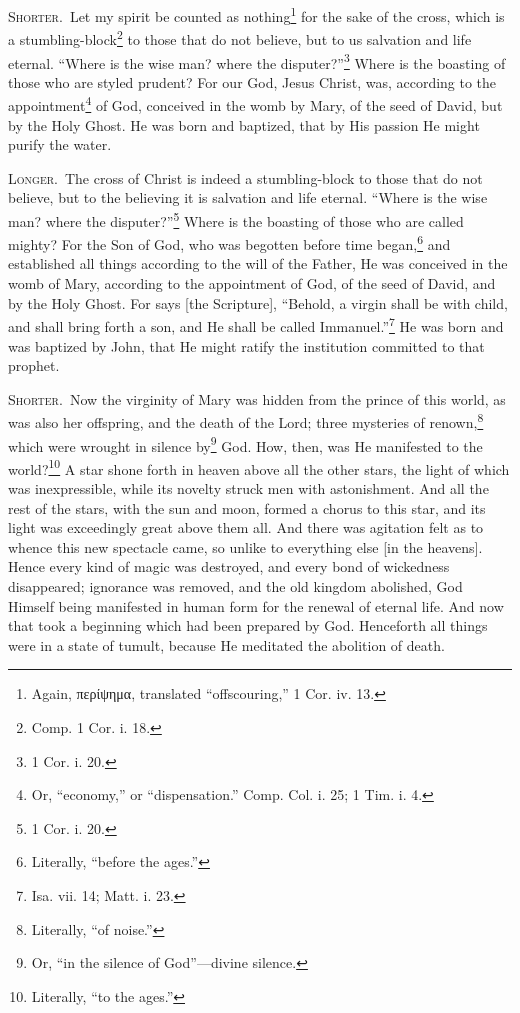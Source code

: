 
\textsc{Shorter.}~Let my spirit be counted as nothing\footnote{Again, \textgreek{περίψημα}, translated “offscouring,” 1 Cor. iv. 13.} for the sake of the cross, which is a stumbling-block\footnote{Comp. 1 Cor. i. 18.} to those that do not believe, but to us salvation and  life eternal. “Where is the wise man? where the disputer?”\footnote{1 Cor. i. 20.} Where is the boasting of those who are styled prudent? For our God, Jesus Christ, was, according to the appointment\footnote{Or, “economy,” or “dispensation.” Comp. Col. i. 25; 1 Tim. i. 4.} of God, conceived in the womb by Mary, of the seed of David, but by the Holy Ghost. He was born and baptized, that by His passion He might purify the water.

\textsc{Longer.}~The cross of Christ is indeed a stumbling-block to those that do not believe, but to the believing it is salvation and life eternal. “Where is the wise man? where the disputer?”\footnote{1 Cor. i. 20.} Where is the boasting of those who are called mighty? For the Son of God, who was begotten before time began,\footnote{Literally, “before the ages.”} and established all things according to the will of the Father, He was conceived in the womb of Mary, according to the appointment of God, of the seed of David, and by the Holy Ghost. For says [the Scripture], “Behold, a virgin shall be with child, and shall bring forth a son, and He shall be called Immanuel.”\footnote{Isa. vii. 14; Matt. i. 23.} He was born and was baptized by John, that He might ratify the institution committed to that prophet.


\textsc{Shorter.}~Now the virginity of Mary was hidden from the prince of this world, as was also her offspring, and the death of the Lord; three mysteries of renown,\footnote{Literally, “of noise.”} which were wrought in silence by\footnote{Or, “in the silence of God”—divine silence.} God. How, then, was He manifested to the world?\footnote{Literally, “to the ages.”} A star shone forth in heaven above all the other stars, the light of which was inexpressible, while its novelty struck men with astonishment. And all the rest of the stars, with the sun and moon, formed a chorus to this star, and its light was exceedingly great above them all. And there was agitation felt as to whence this new spectacle came, so unlike to everything else [in the heavens]. Hence every kind of magic was destroyed, and every bond of wickedness disappeared; ignorance was removed, and the old kingdom abolished, God Himself being manifested in human form for the renewal of eternal life. And now that took a beginning which had been prepared by God. Henceforth all things were in a state of tumult, because He meditated the abolition of death.

